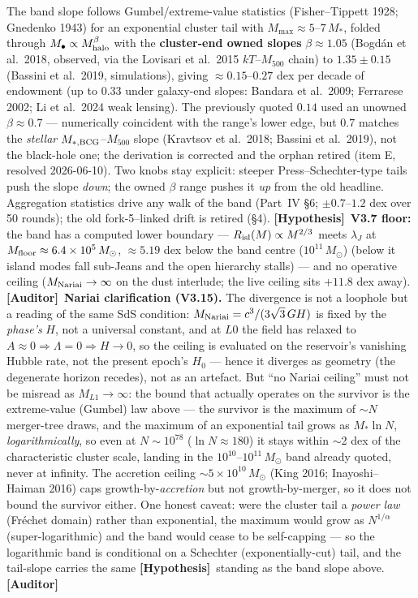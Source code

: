 \documentclass[11pt]{article}
\newcommand{\Auditor}{\textbf{\textcolor{teal!55!black}{[Auditor]}}}
\newcommand{\hyp}{\textcolor{orange!80!black}{\textbf{[Hypothesis]}}}
\newcommand{\msun}{M_\odot}
\begin{document}
The band slope follows Gumbel/extreme-value statistics (Fisher--Tippett 1928; Gnedenko 1943) for an exponential cluster tail with $M_{\max}\approx5$--$7\,M_*$, folded through $M_\bullet\propto M_{\rm halo}^{\beta}$ with the \textbf{cluster-end owned slopes} $\beta\approx1.05$ (Bogd\'an et al.\ 2018, observed, via the Lovisari et al.\ 2015 $kT$--$M_{500}$ chain) to $1.35\pm0.15$ (Bassini et al.\ 2019, simulations), giving $\approx0.15$--$0.27$ dex per decade of endowment (up to $0.33$ under galaxy-end slopes: Bandara et al.\ 2009; Ferrarese 2002; Li et al.\ 2024 weak lensing). The previously quoted $0.14$ used an unowned $\beta\approx0.7$ --- numerically coincident with the range's lower edge, but $0.7$ matches the \emph{stellar} $M_{*,\rm BCG}$--$M_{500}$ slope (Kravtsov et al.\ 2018; Bassini et al.\ 2019), not the black-hole one; the derivation is corrected and the orphan retired (item E, resolved 2026-06-10). Two knobs stay explicit: steeper Press--Schechter-type tails push the slope \emph{down}; the owned $\beta$ range pushes it \emph{up} from the old headline. Aggregation statistics drive any walk of the band (Part~IV \S6; $\pm0.7$--$1.2$ dex over 50 rounds); the old fork-5--linked drift is retired (\S4). \hyp\ \textbf{V3.7 floor:} the band has a computed lower boundary --- $R_{\rm isl}(M)\propto M^{2/3}$ meets $\lambda_J$ at $M_{\rm floor}\approx6.4\times10^{5}\,\msun$, $\approx5.19$ dex below the band centre ($10^{11}\,\msun$) (below it island modes fall sub-Jeans and the open hierarchy stalls) --- and no operative ceiling ($M_{\rm Nariai}\to\infty$ on the dust interlude; the live ceiling sits $+11.8$ dex away). \Auditor\ \textbf{Nariai clarification (V3.15).} The divergence is not a loophole but a reading of the same SdS condition: $M_{\rm Nariai}=c^3/(3\sqrt3\,GH)$ is fixed by the \emph{phase's} $H$, not a universal constant, and at $L0$ the field has relaxed to $A\approx0\Rightarrow\Lambda=0\Rightarrow H\to0$, so the ceiling is evaluated on the reservoir's vanishing Hubble rate, not the present epoch's $H_0$ --- hence it diverges as geometry (the degenerate horizon recedes), not as an artefact. But ``no Nariai ceiling'' must not be misread as $M_{L1}\to\infty$: the bound that actually operates on the survivor is the extreme-value (Gumbel) law above --- the survivor is the maximum of $\sim\!N$ merger-tree draws, and the maximum of an exponential tail grows as $M_*\ln N$, \emph{logarithmically}, so even at $N\sim10^{78}$ ($\ln N\approx180$) it stays within $\sim$2 dex of the characteristic cluster scale, landing in the $10^{10}$--$10^{11}\,\msun$ band already quoted, never at infinity. The accretion ceiling $\sim5\times10^{10}\,\msun$ (King 2016; Inayoshi--Haiman 2016) caps growth-by-\emph{accretion} but not growth-by-merger, so it does not bound the survivor either. One honest caveat: were the cluster tail a \emph{power law} (Fr\'echet domain) rather than exponential, the maximum would grow as $N^{1/\alpha}$ (super-logarithmic) and the band would cease to be self-capping --- so the logarithmic band is conditional on a Schechter (exponentially-cut) tail, and the tail-slope carries the same \hyp\ standing as the band slope above. \Auditor
\end{document}
